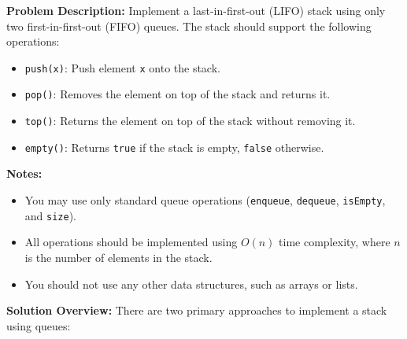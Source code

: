 
\textbf{Problem Description:}  
Implement a last-in-first-out (LIFO) stack using only two first-in-first-out (FIFO) queues. The stack should support the following operations:

\begin{itemize}
    \item \texttt{push(x)}: Push element \texttt{x} onto the stack.
    \item \texttt{pop()}: Removes the element on top of the stack and returns it.
    \item \texttt{top()}: Returns the element on top of the stack without removing it.
    \item \texttt{empty()}: Returns \texttt{true} if the stack is empty, \texttt{false} otherwise.
\end{itemize}

\textbf{Notes:}
\begin{itemize}
    \item You may use only standard queue operations (\texttt{enqueue}, \texttt{dequeue}, \texttt{isEmpty}, and \texttt{size}).
    \item All operations should be implemented using \(O(n)\) time complexity, where \(n\) is the number of elements in the stack.
    \item You should not use any other data structures, such as arrays or lists.
\end{itemize}


\textbf{Solution Overview:}  
There are two primary approaches to implement a stack using queues:

